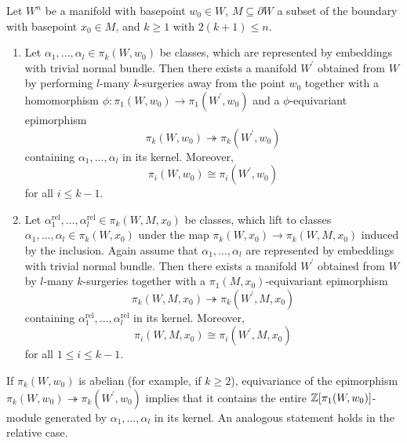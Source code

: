 \newpage
\begin{proposition}
    \label{appendix:prop:surger_killer}
    Let $W^n$ be a manifold with basepoint $w_0 \in W$, $M \subseteq \partial W$ a subset of the boundary with basepoint $x_0 \in M$, and $k \geq 1$ with $2(k+1) \leq n$.
    \begin{enumerate}[label=(\roman*)]
        \item \label{appendix:eq:surgery_killer_absolute_version} Let $\alpha_1,\ldots,\alpha_l \in \pi_k(W,w_0)$ be classes, which are represented by embeddings with trivial normal bundle. Then there exists a manifold $W^\prime$ obtained from $W$ by performing $l$-many $k$-surgeries away from the point $w_0$ together with a homomorphism $\phi \colon \pi_1(W,w_0) \to \pi_1(W^\prime,w_0)$ and a $\phi$-equivariant epimorphism
        \[
        \pi_k(W,w_0) \twoheadrightarrow \pi_k(W^\prime,w_0)
        \]
        containing $\alpha_1,\ldots,\alpha_l$ in its kernel. Moreover, 
        \[
        \pi_i(W,w_0) \cong \pi_i(W^\prime,w_0)
        \] 
        for all $i \leq k-1$.
        \item \label{appendix:eq:surgery_killer_relative_version} Let $\alpha_1^\mathrm{rel},\ldots,\alpha_l^\mathrm{rel} \in \pi_k(W,M,x_0)$ be classes, which lift to classes $\alpha_1,\ldots,\alpha_l \in \pi_k(W,x_0)$ under the map $\pi_k(W,x_0) \to \pi_k(W,M,x_0)$ induced by the inclusion. Again assume that $\alpha_1,\ldots,\alpha_l$ are represented by embeddings with trivial normal bundle. Then there exists a manifold $W^\prime$ obtained from $W$ by $l$-many $k$-surgeries together with a $\pi_1(M,x_0)$-equivariant epimorphism
        \[
        \pi_k(W,M,x_0) \twoheadrightarrow \pi_k(W^\prime,M,x_0)
        \]
        containing $\alpha_1^\mathrm{rel},\ldots,\alpha_l^\mathrm{rel}$ in its kernel. Moreover, 
        \[
        \pi_i(W,M,x_0) \cong \pi_i(W^\prime,M,x_0)
        \] 
        for all $1 \leq i \leq k-1$.
    \end{enumerate}
\end{proposition}

\begin{remark}
    \label{appendix:rem:zpi_module_in_kernel}
    If $\pi_k(W,w_0)$ is abelian (for example, if $k \geq 2$), equivariance of the epimorphism $\pi_k(W,w_0) \twoheadrightarrow \pi_k(W^\prime,w_0)$ implies that it contains the entire $\mathbb{Z}[\pi_1(W,w_0)]$-module generated by $\alpha_1,\ldots,\alpha_l$ in its kernel. An analogous statement holds in the relative case. 
\end{remark}

